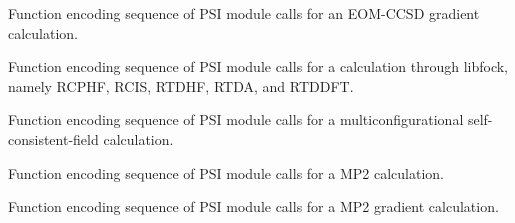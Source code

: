 \documentclass[letterpaper,10pt,english]{sphinxmanual}
\begin{document}

\begin{fulllineitems}
\label{index:proc.run_eom_cc_gradient}
Function encoding sequence of PSI module calls for
an EOM-CCSD gradient calculation.

\end{fulllineitems}


\begin{fulllineitems}
\label{index:proc.run_libfock}
Function encoding sequence of PSI module calls for
a calculation through libfock, namely RCPHF,
RCIS, RTDHF, RTDA, and RTDDFT.

\end{fulllineitems}


\begin{fulllineitems}
\label{index:proc.run_mcscf}
Function encoding sequence of PSI module calls for
a multiconfigurational self-consistent-field calculation.

\end{fulllineitems}


\begin{fulllineitems}
\label{index:proc.run_mp2}
Function encoding sequence of PSI module calls for
a MP2 calculation.

\end{fulllineitems}


\begin{fulllineitems}
\label{index:proc.run_mp2_gradient}
Function encoding sequence of PSI module calls for
a MP2 gradient calculation.

\end{fulllineitems}

\end{document}
